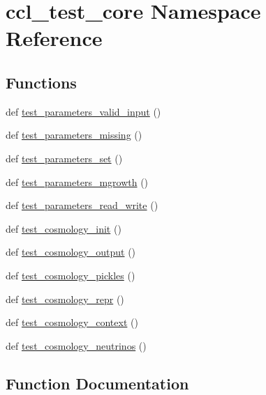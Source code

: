 \hypertarget{namespaceccl__test__core}{}\section{ccl\+\_\+test\+\_\+core Namespace Reference}
\label{namespaceccl__test__core}
\subsection*{Functions}
\begin{DoxyCompactItemize}
\item 
def \mbox{\hyperlink{namespaceccl__test__core_a5d78733a80588dd665203627d89b0b6f}{test\+\_\+parameters\+\_\+valid\+\_\+input}} ()
\item 
def \mbox{\hyperlink{namespaceccl__test__core_a0e549d6d40a6192560d27eeee5a52c6a}{test\+\_\+parameters\+\_\+missing}} ()
\item 
def \mbox{\hyperlink{namespaceccl__test__core_a6d316a5e78c5a180dfc4b6887fa0b9f8}{test\+\_\+parameters\+\_\+set}} ()
\item 
def \mbox{\hyperlink{namespaceccl__test__core_a1cf68bb2178c995528cfa1a7f1c14832}{test\+\_\+parameters\+\_\+mgrowth}} ()
\item 
def \mbox{\hyperlink{namespaceccl__test__core_a924e671fa5314cb9250c4e9205105870}{test\+\_\+parameters\+\_\+read\+\_\+write}} ()
\item 
def \mbox{\hyperlink{namespaceccl__test__core_a4d2642cc4efaf3e38a2ba27fecc98abd}{test\+\_\+cosmology\+\_\+init}} ()
\item 
def \mbox{\hyperlink{namespaceccl__test__core_a7086ffc367c4c602cd12e67b76209a44}{test\+\_\+cosmology\+\_\+output}} ()
\item 
def \mbox{\hyperlink{namespaceccl__test__core_a6eb4932e1d1d3b5ba670e92cb7380254}{test\+\_\+cosmology\+\_\+pickles}} ()
\item 
def \mbox{\hyperlink{namespaceccl__test__core_a378920c66829abd38df0532cdbc13f22}{test\+\_\+cosmology\+\_\+repr}} ()
\item 
def \mbox{\hyperlink{namespaceccl__test__core_a62090b86ba8470f93cbfb1241ce581be}{test\+\_\+cosmology\+\_\+context}} ()
\item 
def \mbox{\hyperlink{namespaceccl__test__core_ad7e087ba6d61d749605619aa335fbaa6}{test\+\_\+cosmology\+\_\+neutrinos}} ()
\end{DoxyCompactItemize}


\subsection{Function Documentation}
\mbox{\label{namespaceccl__test__core_a62090b86ba8470f93cbfb1241ce581be}} 
